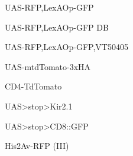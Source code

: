 \documentclass[17pt]{extarticle}
\begin{document}
\vspace*{\fill}
\newpage{}
\vspace*{\fill}\begin{small}
UAS-RFP,LexAOp-GFP \\[0.5em]
\end{small}
\footnotesize
\vspace*{\fill}
\newpage{}
\vspace*{\fill}\begin{footnotesize}
UAS-RFP,LexAOp-GFP DB \\[0.5em]
\end{footnotesize}
\footnotesize
\vspace*{\fill}
\newpage{}
\vspace*{\fill}\begin{footnotesize}
UAS-RFP,LexAOp-GFP,VT50405 \\[0.5em]
\end{footnotesize}
\footnotesize
\vspace*{\fill}
\newpage{}
\vspace*{\fill}\begin{small}
UAS-mtdTomato-3xHA \\[0.5em]
\end{small}
\footnotesize
\vspace*{\fill}
\newpage{}
\vspace*{\fill}\begin{normalsize}
CD4-TdTomato \\[0.5em]
\end{normalsize}
\footnotesize
\vspace*{\fill}
\newpage{}
\vspace*{\fill}\begin{normalsize}
UAS>stop>Kir2.1 \\[0.5em]
\end{normalsize}
\footnotesize
\vspace*{\fill}
\newpage{}
\vspace*{\fill}\begin{small}
UAS>stop>CD8::GFP \\[0.5em]
\end{small}
\footnotesize
\vspace*{\fill}
\newpage{}
\vspace*{\fill}\begin{small}
His2Av-RFP (III) \\[0.5em]
\end{small}
\footnotesize
\end{document}
